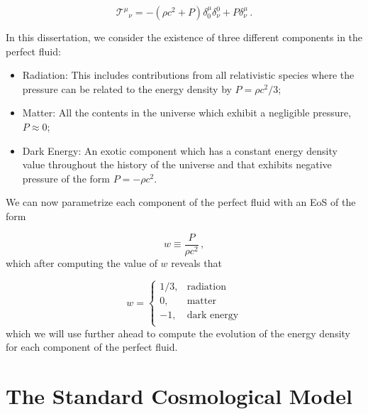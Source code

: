 \begin{equation}
    \label{eq:perfect-fluid}
    \mathcal{T}^\mu{}_\nu = - (\rho c^2 + P) \delta^\mu_0 \delta^0_\nu + P \delta^\mu_\nu \,.
\end{equation}

\noindent In this dissertation, we consider the existence of three different components in the perfect fluid:

\begin{itemize}
    \item Radiation: This includes contributions from all relativistic species where the pressure can be related to the energy density by $P = \rho c^2 / 3$;
    \item Matter: All the contents in the universe which exhibit a negligible pressure, $P \approx 0$;
    \item Dark Energy: An exotic component which has a constant energy density value throughout the history of the universe and that exhibits negative pressure of the form $P = - \rho c^2$.
\end{itemize}
We can now parametrize each component of the perfect fluid with an \gls{EoS} of the form

\begin{equation}
    \label{eq:EoS}
    w \equiv \frac{P}{\rho c^2} \,,
\end{equation}
which after computing the value of $w$ reveals that

\begin{equation}
    \label{eq:EoS-components}
    w = \left\{
    \begin{array}{ll}
        1/3, & \text{radiation}    \\
        0,   & \text{matter}       \\
        -1,  & \text{dark energy}  \\
    \end{array}
    \right.
\end{equation}
which we will use further ahead to compute the evolution of the energy density for each component of the perfect fluid.


\section{The Standard Cosmological Model}
\label{sec:LCDM}

